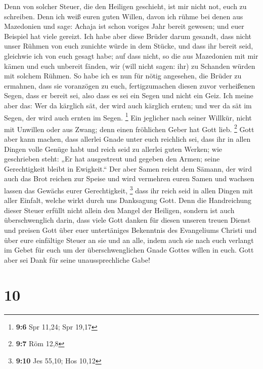  Denn von solcher Steuer, die den Heiligen geschieht, ist
mir nicht not, euch zu schreiben.  Denn ich weiß euren
guten Willen, davon ich rühme bei denen aus Mazedonien und sage: Achaja
ist schon voriges Jahr bereit gewesen; und euer Beispiel hat viele
gereizt.  Ich habe aber diese Brüder darum gesandt, dass
nicht unser Rühmen von euch zunichte würde in dem Stücke, und dass ihr
bereit seid, gleichwie ich von euch gesagt habe;  auf dass
nicht, so die aus Mazedonien mit mir kämen und euch unbereit fänden, wir
(will nicht sagen: ihr) zu Schanden würden mit solchem Rühmen.
 So habe ich es nun für nötig angesehen, die Brüder zu
ermahnen, dass sie voranzögen zu euch, fertigzumachen diesen zuvor
verheißenen Segen, dass er bereit sei, also dass es sei ein Segen und
nicht ein Geiz.  Ich meine aber das: Wer da kärglich sät,
der wird auch kärglich ernten; und wer da sät im Segen, der wird auch
ernten im Segen. \footnote{\textbf{9:6} Spr 11,24; Spr 19,17}
 Ein jeglicher nach seiner Willkür, nicht mit Unwillen
oder aus Zwang; denn einen fröhlichen Geber hat Gott lieb. \footnote{\textbf{9:7}
  Röm 12,8}  Gott aber kann machen, dass allerlei Gnade
unter euch reichlich sei, dass ihr in allen Dingen volle Genüge habt und
reich seid zu allerlei guten Werken;  wie geschrieben
steht: „Er hat ausgestreut und gegeben den Armen; seine Gerechtigkeit
bleibt in Ewigkeit.``  Der aber Samen reicht dem Sämann,
der wird auch das Brot reichen zur Speise und wird vermehren euren Samen
und wachsen lassen das Gewächs eurer Gerechtigkeit, \footnote{\textbf{9:10}
  Jes 55,10; Hos 10,12}  dass ihr reich seid in allen
Dingen mit aller Einfalt, welche wirkt durch uns Danksagung Gott.
 Denn die Handreichung dieser Steuer erfüllt nicht allein
den Mangel der Heiligen, sondern ist auch überschwenglich darin, dass
viele Gott danken für diesen unseren treuen Dienst  und
preisen Gott über euer untertäniges Bekenntnis des Evangeliums Christi
und über eure einfältige Steuer an sie und an alle, 
indem auch sie nach euch verlangt im Gebet für euch um der
überschwenglichen Gnade Gottes willen in euch.  Gott aber
sei Dank für seine unaussprechliche Gabe!

\hypertarget{section-9}{%
\section{10}\label{section-9}}

